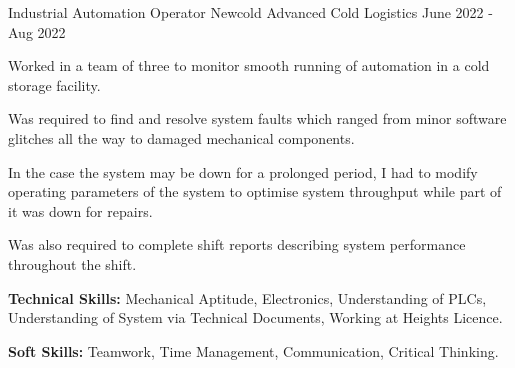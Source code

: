 \begin{cventries}
  \cventry
    {Industrial Automation Operator}                   %
    {Newcold Advanced Cold Logistics}   %
    {}              %
    {June 2022 - Aug 2022}              %
    {
      \begin{cvitems} %
        \item {Worked in a team of three to monitor smooth running of automation in a cold storage facility.}
        \item {Was required to find and resolve system faults which ranged from minor software glitches all the way to damaged mechanical components.}
        \item {In the case the system may be down for a prolonged period, I had to modify operating parameters of the system to optimise system throughput while part of it was down for repairs.}
        \item {Was also required to complete shift reports describing system performance throughout the shift.}
        \item {\textbf{Technical Skills:} Mechanical Aptitude, Electronics, Understanding of PLCs, Understanding of System via Technical Documents, Working at Heights Licence.}
        \item {\textbf{Soft Skills:} Teamwork, Time Management, Communication, Critical Thinking.}
      \end{cvitems}
    }


\end{cventries}

